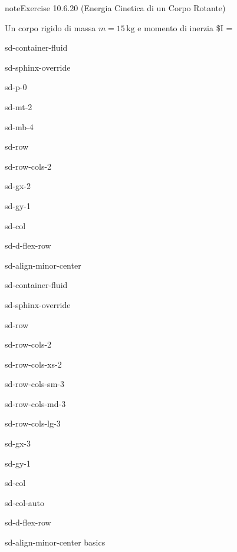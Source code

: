 \documentclass[letterpaper,10pt,italian]{jupyterBook}
\begin{document}
\begin{sphinxadmonition}{note}{Exercise 10.6.20 (Energia Cinetica di un Corpo Rotante)}



\sphinxAtStartPar
Un corpo rigido di massa \(m = 15 \, \text{kg}\) e momento di inerzia \$I =
\end{sphinxadmonition}

\sphinxstepscope

\begin{sphinxuseclass}{sd-container-fluid}
\begin{sphinxuseclass}{sd-sphinx-override}
\begin{sphinxuseclass}{sd-p-0}
\begin{sphinxuseclass}{sd-mt-2}
\begin{sphinxuseclass}{sd-mb-4}
\begin{sphinxuseclass}{sd-row}
\begin{sphinxuseclass}{sd-row-cols-2}
\begin{sphinxuseclass}{sd-gx-2}
\begin{sphinxuseclass}{sd-gy-1}
\begin{sphinxuseclass}{sd-col}
\begin{sphinxuseclass}{sd-d-flex-row}
\begin{sphinxuseclass}{sd-align-minor-center}
\begin{sphinxuseclass}{sd-container-fluid}
\begin{sphinxuseclass}{sd-sphinx-override}
\begin{sphinxuseclass}{sd-row}
\begin{sphinxuseclass}{sd-row-cols-2}
\begin{sphinxuseclass}{sd-row-cols-xs-2}
\begin{sphinxuseclass}{sd-row-cols-sm-3}
\begin{sphinxuseclass}{sd-row-cols-md-3}
\begin{sphinxuseclass}{sd-row-cols-lg-3}
\begin{sphinxuseclass}{sd-gx-3}
\begin{sphinxuseclass}{sd-gy-1}
\begin{sphinxuseclass}{sd-col}
\begin{sphinxuseclass}{sd-col-auto}
\begin{sphinxuseclass}{sd-d-flex-row}
\begin{sphinxuseclass}{sd-align-minor-center}
\sphinxAtStartPar
basics


\end{sphinxuseclass}
\end{sphinxuseclass}
\end{sphinxuseclass}
\end{sphinxuseclass}
\end{sphinxuseclass}
\end{sphinxuseclass}
\end{sphinxuseclass}
\end{sphinxuseclass}
\end{sphinxuseclass}
\end{sphinxuseclass}
\end{sphinxuseclass}
\end{sphinxuseclass}
\end{sphinxuseclass}
\end{sphinxuseclass}
\end{sphinxuseclass}
\end{sphinxuseclass}
\end{sphinxuseclass}
\end{sphinxuseclass}
\end{sphinxuseclass}
\end{sphinxuseclass}
\end{sphinxuseclass}
\end{sphinxuseclass}
\end{sphinxuseclass}
\end{sphinxuseclass}
\end{sphinxuseclass}
\end{sphinxuseclass}
\end{document}
